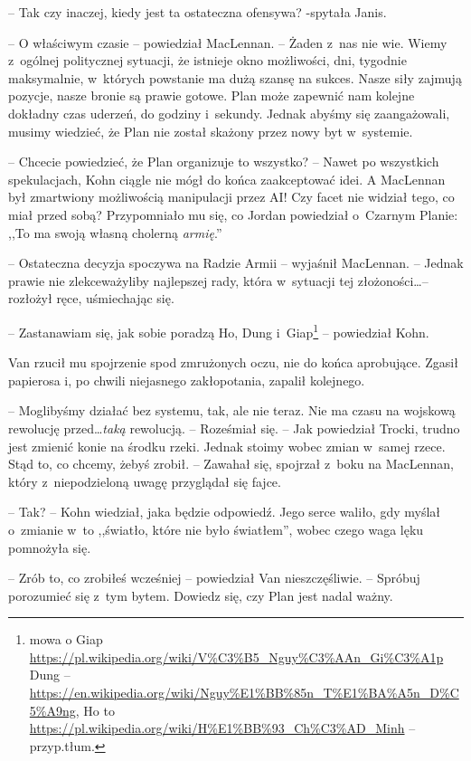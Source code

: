 \documentclass[oneside,polish,11pt,sfheadings]{mwbk}
\begin{document}
-- Tak czy inaczej, kiedy jest ta ostateczna ofensywa? -spytała Janis.

-- O właściwym czasie -- powiedział MacLennan. -- Żaden z~nas nie wie.
Wiemy z~ogólnej politycznej sytuacji, że istnieje okno możliwości, dni,
tygodnie maksymalnie, w~których powstanie ma dużą szansę na sukces.
Nasze siły zajmują pozycje, nasze bronie są prawie gotowe. Plan może
zapewnić nam kolejne dokładny czas uderzeń, do godziny i~sekundy. Jednak
abyśmy się zaangażowali, musimy wiedzieć, że Plan nie został skażony
przez nowy byt w~systemie.

-- Chcecie powiedzieć, że Plan organizuje to wszystko? -- Nawet po
wszystkich spekulacjach, Kohn ciągle nie mógł do końca zaakceptować
idei. A MacLennan był zmartwiony możliwością manipulacji przez AI! Czy
facet nie widział tego, co miał przed sobą? Przypomniało mu się, co
Jordan powiedział o~Czarnym Planie: ,,To ma swoją własną cholerną
\emph{armię}.''

-- Ostateczna decyzja spoczywa na Radzie Armii -- wyjaśnił MacLennan. -- Jednak prawie nie zlekceważyliby najlepszej rady, która w~sytuacji tej
złożoności\ldots -- rozłożył ręce, uśmiechając się.

-- Zastanawiam się, jak sobie poradzą Ho, Dung i~Giap\footnote{ mowa o Giap 
\url{https://pl.wikipedia.org/wiki/V\%C3\%B5\_Nguy\%C3\%AAn\_Gi\%C3\%A1p} 
Dung --
\url{https://en.wikipedia.org/wiki/Nguy\%E1\%BB\%85n\_T\%E1\%BA\%A5n\_D\%C5\%A9ng},
Ho to \url{https://pl.wikipedia.org/wiki/H\%E1\%BB\%93_Ch\%C3\%AD_Minh} -- przyp.tłum.} -- powiedział Kohn.


Van rzucił mu spojrzenie spod zmrużonych oczu, nie do końca aprobujące.
Zgasił papierosa i, po chwili niejasnego zakłopotania, zapalił
kolejnego. 

-- Moglibyśmy działać bez systemu, tak, ale nie teraz. Nie ma
czasu na wojskową rewolucję przed\ldots \emph{taką} rewolucją. -- Roześmiał
się. -- Jak powiedział Trocki, trudno jest zmienić konie na środku rzeki.
Jednak stoimy wobec zmian w~samej rzece. Stąd to, co chcemy, żebyś
zrobił. -- Zawahał się, spojrzał z~boku na MacLennan, który z~niepodzieloną uwagę przyglądał się fajce.

-- Tak? -- Kohn wiedział, jaka będzie odpowiedź. Jego serce waliło, gdy
myślał o~zmianie w~to ,,światło, które nie było światłem'', wobec czego
waga lęku pomnożyła się.

-- Zrób to, co zrobiłeś wcześniej -- powiedział Van nieszczęśliwie. -- Spróbuj porozumieć się z~tym bytem. Dowiedz się, czy Plan jest nadal
ważny.
\end{document}
